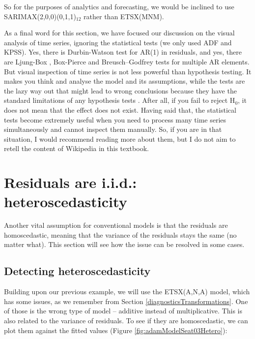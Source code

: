 \documentclass[
]{book}
\theoremstyle{definition}
\theoremstyle{definition}
\theoremstyle{definition}
\theoremstyle{definition}
\theoremstyle{remark}
\begin{document}
So for the purposes of analytics and forecasting, we would be inclined to use SARIMAX(2,0,0)(0,1,1)\(_{12}\) rather than ETSX(MNM).

As a final word for this section, we have focused our discussion on the visual analysis of time series, ignoring the statistical tests (we only used ADF and KPSS). Yes, there is Durbin-Watson \citep{WikipediaDurbinWatson2021} test for AR(1) in residuals, and yes, there are Ljung-Box \citep{WikipediaLjungBox2021}, Box-Pierce and Breusch--Godfrey \citep{WikipediaBreuschGodfrey2021} tests for multiple AR elements. But visual inspection of time series is not less powerful than hypothesis testing. It makes you think and analyse the model and its assumptions, while the tests are the lazy way out that might lead to wrong conclusions because they have the standard limitations of any hypothesis tests \citep[as discussed in Section 5.3 of][]{SvetunkovSBA}. After all, if you fail to reject H\(_0\), it does not mean that the effect does not exist. Having said that, the statistical tests become extremely useful when you need to process many time series simultaneously and cannot inspect them manually. So, if you are in that situation, I would recommend reading more about them, but I do not aim to retell the content of Wikipedia in this textbook.

\hypertarget{diagnosticsResidualsIIDHetero}{%
\section{Residuals are i.i.d.: heteroscedasticity}\label{diagnosticsResidualsIIDHetero}}

Another vital assumption for conventional models is that the residuals are homoscedastic, meaning that the variance of the residuals stays the same (no matter what). This section will see how the issue can be resolved in some cases.

\hypertarget{detecting-heteroscedasticity}{%
\subsection{Detecting heteroscedasticity}\label{detecting-heteroscedasticity}}

Building upon our previous example, we will use the ETSX(A,N,A) model, which has some issues, as we remember from Section \ref{diagnosticsTransformations}. One of those is the wrong type of model -- additive instead of multiplicative. This is also related to the variance of residuals. To see if they are homoscedastic, we can plot them against the fitted values (Figure \ref{fig:adamModelSeat03Hetero}):
\end{document}
